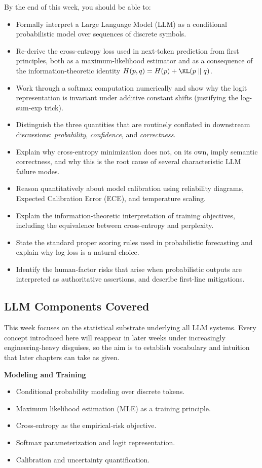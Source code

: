 By the end of this week, you should be able to:
\begin{itemize}
  \item Formally interpret a Large Language Model (LLM) as a conditional probabilistic model over sequences of discrete symbols.
  \item Re-derive the cross-entropy loss used in next-token prediction from first principles, both as a maximum-likelihood estimator and as a consequence of the information-theoretic identity $H(p,q) = H(p) + \KL(p \parallel q)$.
  \item Work through a softmax computation numerically and show why the logit representation is invariant under additive constant shifts (justifying the log-sum-exp trick).
  \item Distinguish the three quantities that are routinely conflated in downstream discussions: \emph{probability}, \emph{confidence}, and \emph{correctness}.
  \item Explain why cross-entropy minimization does not, on its own, imply semantic correctness, and why this is the root cause of several characteristic LLM failure modes.
  \item Reason quantitatively about model calibration using reliability diagrams, Expected Calibration Error (ECE), and temperature scaling.
  \item Explain the information-theoretic interpretation of training objectives, including the equivalence between cross-entropy and perplexity.
  \item State the standard proper scoring rules used in probabilistic forecasting and explain why log-loss is a natural choice.
  \item Identify the human-factor risks that arise when probabilistic outputs are interpreted as authoritative assertions, and describe first-line mitigations.
\end{itemize}

\subsection{LLM Components Covered}

This week focuses on the statistical substrate underlying all LLM systems. Every concept introduced here will reappear in later weeks under increasingly engineering-heavy disguises, so the aim is to establish vocabulary and intuition that later chapters can take as given.

\textbf{Modeling and Training}
\begin{itemize}
  \item Conditional probability modeling over discrete tokens.
  \item Maximum likelihood estimation (MLE) as a training principle.
  \item Cross-entropy as the empirical-risk objective.
  \item Softmax parameterization and logit representation.
  \item Calibration and uncertainty quantification.
\end{itemize}

